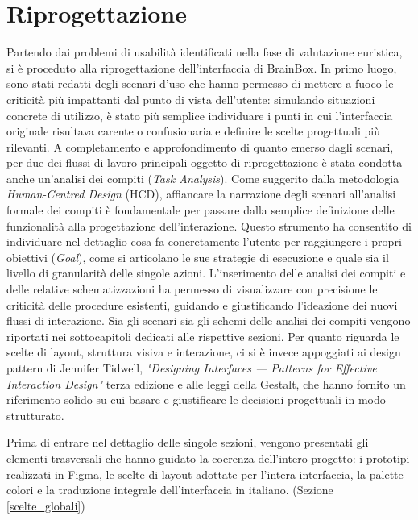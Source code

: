 \section{Riprogettazione}
Partendo dai problemi di usabilità identificati nella fase di valutazione euristica, si è proceduto alla riprogettazione dell'interfaccia di BrainBox.
In primo luogo, sono stati redatti degli scenari d'uso che hanno permesso di mettere a fuoco le criticità più impattanti dal punto di vista dell'utente: simulando situazioni concrete di utilizzo, è stato più semplice individuare i punti in cui l'interfaccia originale risultava carente o confusionaria e definire le scelte progettuali più rilevanti.
A completamento e approfondimento di quanto emerso dagli scenari, per due dei flussi di lavoro principali oggetto di riprogettazione è stata condotta anche un'analisi dei compiti (\textit{Task Analysis}). Come suggerito dalla metodologia \textit{Human-Centred Design} (HCD), affiancare la narrazione degli scenari all'analisi formale dei compiti è fondamentale per passare dalla semplice definizione delle funzionalità alla progettazione dell'interazione. Questo strumento ha consentito di individuare nel dettaglio cosa fa concretamente l'utente per raggiungere i propri obiettivi (\textit{Goal}), come si articolano le sue strategie di esecuzione e quale sia il livello di granularità delle singole azioni. L'inserimento delle analisi dei compiti e delle relative schematizzazioni ha permesso di visualizzare con precisione le criticità delle procedure esistenti, guidando e giustificando l'ideazione dei nuovi flussi di interazione.
Sia gli scenari sia gli schemi delle analisi dei compiti vengono riportati nei sottocapitoli dedicati alle rispettive sezioni. Per quanto riguarda le scelte di layout, struttura visiva e interazione, ci si è invece appoggiati ai design pattern di Jennifer Tidwell, \textit{"Designing Interfaces — Patterns for Effective Interaction Design"} terza edizione e alle leggi della Gestalt, che hanno fornito un riferimento solido su cui basare e giustificare le decisioni progettuali in modo strutturato.

Prima di entrare nel dettaglio delle singole sezioni, vengono presentati gli elementi trasversali che hanno guidato la coerenza dell'intero progetto: i prototipi realizzati in Figma, le scelte di layout adottate per l'intera interfaccia, la palette colori e la traduzione integrale dell'interfaccia in italiano. (Sezione \ref{scelte_globali})

